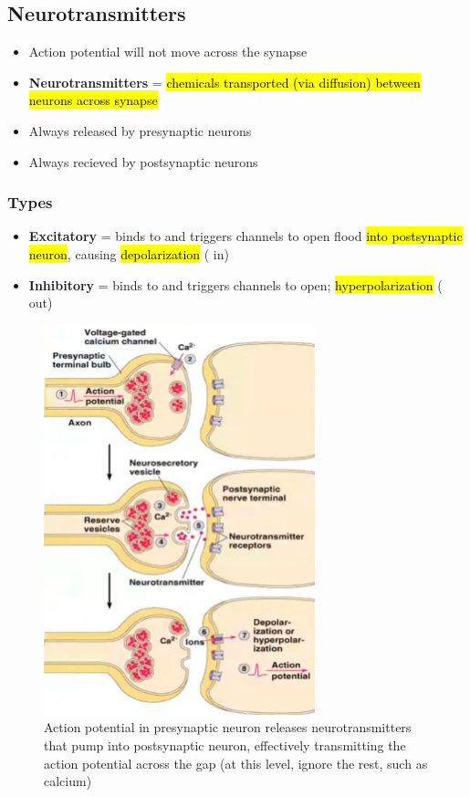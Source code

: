 \documentclass[a4paper,12pt]{article}
\begin{document}
\subsection{Neurotransmitters}
\begin{itemize}
    \item{Action potential will not move across the synapse}
    \item{\textbf{Neurotransmitters} = \hl{chemicals transported (via diffusion) between neurons across synapse}}
    \item{Always released by presynaptic neurons}
    \item{Always recieved by postsynaptic neurons}
\end{itemize}

\subsubsection{Types}
\begin{itemize}
    \item{\textbf{Excitatory} = binds to and triggers  channels to open  flood \hl{into postsynaptic neuron}, causing \hl{depolarization} ( in)}
    \item{\textbf{Inhibitory} = binds to and triggers  channels to open; \hl{hyperpolarization} ( out)}
\end{itemize}

\begin{figure}[H]
    \centering
    \includegraphics[width=0.7\textwidth]{neurotransmission}
    \caption{Action potential in presynaptic neuron releases neurotransmitters that pump  into postsynaptic neuron, effectively transmitting the action potential across the gap (at this level, ignore the rest, such as calcium)}
\end{figure}
\end{document}
